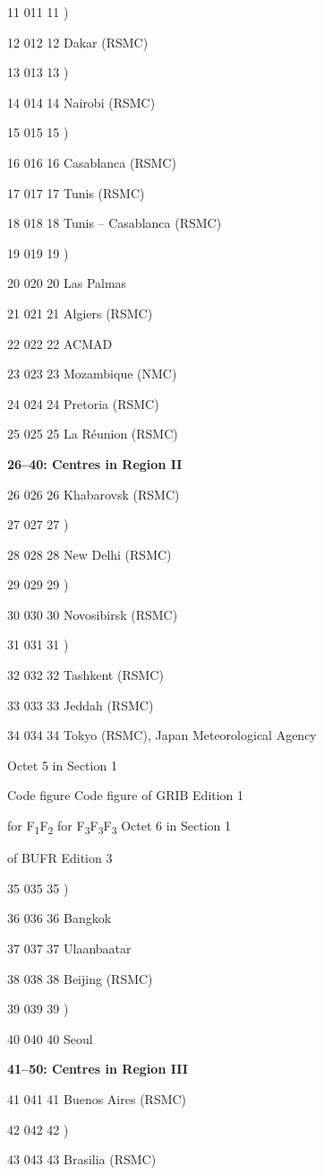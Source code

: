11 011 11 )

12 012 12 Dakar (RSMC)

13 013 13 )

14 014 14 Nairobi (RSMC)

15 015 15 )

16 016 16 Casablanca (RSMC)

17 017 17 Tunis (RSMC)

18 018 18 Tunis -- Casablanca (RSMC)

19 019 19 )

20 020 20 Las Palmas

21 021 21 Algiers (RSMC)

22 022 22 ACMAD

23 023 23 Mozambique (NMC)

24 024 24 Pretoria (RSMC)

25 025 25 La Réunion (RSMC)

\textbf{26--40: Centres in Region II}

26 026 26 Khabarovsk (RSMC)

27 027 27 )

28 028 28 New Delhi (RSMC)

29 029 29 )

30 030 30 Novosibirsk (RSMC)

31 031 31 )

32 032 32 Tashkent (RSMC)

33 033 33 Jeddah (RSMC)

34 034 34 Tokyo (RSMC), Japan Meteorological Agency

Octet 5 in Section 1

Code figure Code figure of GRIB Edition 1

for F\textsubscript{1}F\textsubscript{2} for F\textsubscript{3}F\textsubscript{3}F\textsubscript{3} Octet 6 in Section 1

of BUFR Edition 3

35 035 35 )

36 036 36 Bangkok

37 037 37 Ulaanbaatar

38 038 38 Beijing (RSMC)

39 039 39 )

40 040 40 Seoul

\textbf{41--50: Centres in Region III}

41 041 41 Buenos Aires (RSMC)

42 042 42 )

43 043 43 Brasilia (RSMC)

